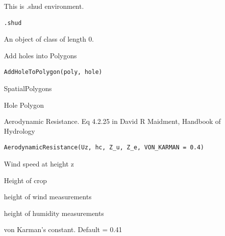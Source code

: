 \documentclass[a4paper]{book}
\begin{document}
%
\begin{Description}\relax
This is .shud environment.
\end{Description}
%
\begin{Usage}
\begin{verbatim}
.shud
\end{verbatim}
\end{Usage}
%
\begin{Format}
An object of class  of length 0.
\end{Format}
%
\begin{Description}\relax
Add holes into Polygons
\end{Description}
%
\begin{Usage}
\begin{verbatim}
AddHoleToPolygon(poly, hole)
\end{verbatim}
\end{Usage}
%
\begin{Arguments}
\begin{ldescription}
\item[\code{poly}] SpatialPolygons

\item[\code{hole}] Hole Polygon
\end{ldescription}
\end{Arguments}
%
\begin{Description}\relax
Aerodynamic Resistance. Eq 4.2.25 in David R Maidment, Handbook of Hydrology
\end{Description}
%
\begin{Usage}
\begin{verbatim}
AerodynamicResistance(Uz, hc, Z_u, Z_e, VON_KARMAN = 0.4)
\end{verbatim}
\end{Usage}
%
\begin{Arguments}
\begin{ldescription}
\item[\code{Uz}] Wind speed at height z 

\item[\code{hc}] Height of crop 

\item[\code{Z\_u}] height of wind measurements 

\item[\code{Z\_e}] height of humidity measurements 

\item[\code{VON\_KARMAN}] von Karman's constant. Default = 0.41 
\end{ldescription}
\end{Arguments}
\end{document}
